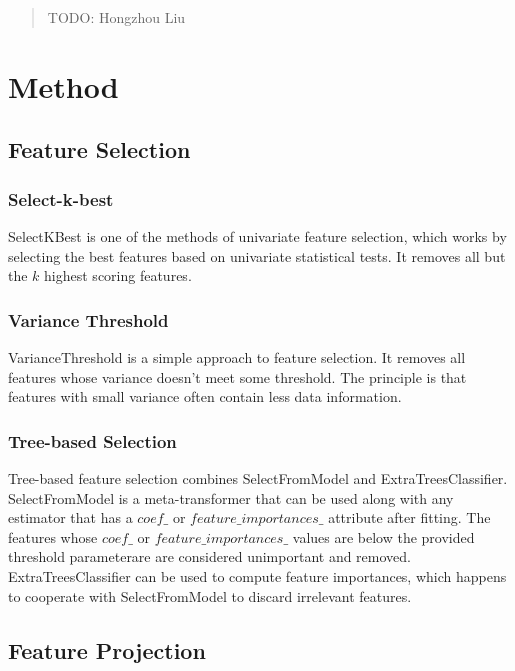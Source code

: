 \documentclass{article}
\begin{document}
\begin{abstract}
  TODO: Hongzhou Liu\\
\end{abstract}

\section{Method}
\subsection{Feature Selection}
\subsubsection{Select-k-best}
\indent SelectKBest is one of the methods of univariate feature selection, which works by selecting the best features based on univariate statistical tests. It removes all but the $k$ highest scoring features.
\subsubsection{Variance Threshold}
\indent VarianceThreshold is a simple approach to feature selection. It removes all features whose variance doesn’t meet some threshold. The principle is that features with small variance often contain less data information.
\subsubsection{Tree-based Selection}
\indent Tree-based feature selection combines SelectFromModel and ExtraTreesClassifier. SelectFromModel is a meta-transformer that can be used along with any estimator that has a $coef\_$ or $feature\_importances\_$ attribute after fitting. The features whose $coef\_$ or $feature\_importances\_$ values are below the provided threshold parameterare are considered unimportant and removed. ExtraTreesClassifier can be used to compute feature importances, which happens to cooperate with SelectFromModel to discard irrelevant features.

\subsection{Feature Projection}
\end{document}
